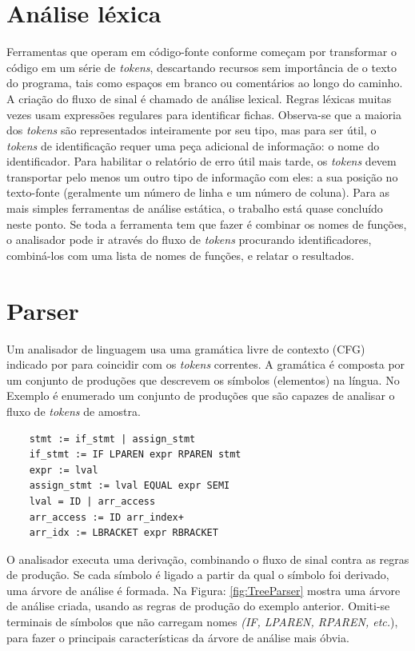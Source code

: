 	\section {Análise léxica}
	
	Ferramentas que operam em código-fonte conforme \cite{Wichmann95industrialperspective} começam por transformar o código em um série de {\it tokens}, descartando recursos sem importância de o texto do programa, tais como espaços em branco ou comentários ao longo do caminho. A criação do fluxo de sinal é chamado de análise lexical. Regras léxicas muitas vezes usam expressões regulares para identificar fichas.
	Observa-se que a maioria dos {\it tokens} são representados inteiramente por seu tipo, mas para ser útil, o {\it tokens} de identificação requer uma peça adicional de informação: o nome do identificador. Para habilitar o relatório de erro útil mais tarde, os {\it tokens} devem transportar pelo menos um outro tipo de informação com eles: a sua posição no texto-fonte (geralmente um número de linha e um número de coluna). Para as mais simples ferramentas de análise estática, o trabalho está quase concluído neste ponto. Se toda a ferramenta tem que fazer é combinar os nomes de funções, o analisador pode ir através do fluxo de {\it tokens} procurando identificadores, combiná-los com uma lista de nomes de funções, e relatar o resultados.\\
	
	\section{Parser}
	
	Um analisador de linguagem usa uma gramática livre de contexto (CFG) indicado por \cite{Chess:2007:SPS:1406221} para coincidir com os {\it tokens} correntes. A gramática é composta por um conjunto de produções que descrevem os símbolos (elementos) na língua. No Exemplo é enumerado um conjunto de produções que são capazes de analisar o fluxo de {\it tokens} de amostra.
	
	\begin{lstlisting}
	stmt := if_stmt | assign_stmt
	if_stmt := IF LPAREN expr RPAREN stmt
	expr := lval
	assign_stmt := lval EQUAL expr SEMI
	lval = ID | arr_access
	arr_access := ID arr_index+
	arr_idx := LBRACKET expr RBRACKET
	\end{lstlisting}
	
	O analisador executa uma derivação, combinando o fluxo de sinal contra as regras de produção. Se cada símbolo é ligado a partir da qual o símbolo foi derivado, uma árvore de análise é formada. Na Figura: \ref{fig:TreeParser} mostra uma árvore de análise criada, usando as regras de produção do exemplo anterior. Omiti-se terminais de símbolos que não carregam nomes \textit{(IF, LPAREN, RPAREN, etc.}), para fazer o principais características da árvore de análise mais óbvia.\\
	
